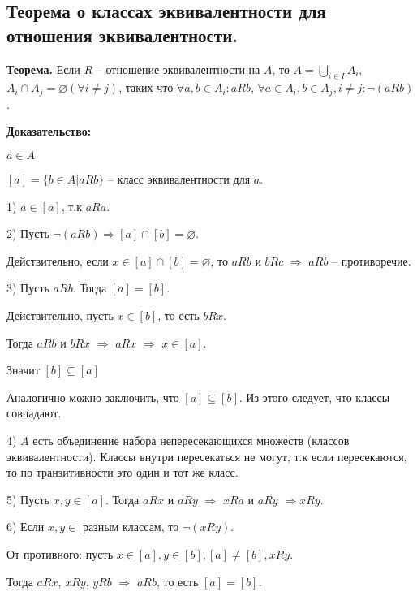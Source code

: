 \subsection{Теорема о классах эквивалентности для отношения эквивалентности.}

\textbf{Теорема.} Если $R$ -- отношение эквивалентности на $A$, то $A = \bigcup_{i \in I}A_i$, $A_i \cap A_j = \varnothing (\forall i \neq j)$, таких что $\forall a, b \in A_i : aRb$, $\forall a \in A_i, b \in A_j, i \neq j : \neg (aRb)$.

\textbf{Доказательство:}

$a \in A$

$[a] = \{b \in A | aRb\}$ -- класс эквивалентности для $a$.

1) $a \in [a]$, т.к $aRa$.

2) Пусть $\neg (aRb) \Rightarrow [a] \cap [b] = \varnothing$.

Действительно, если $x \in [a] \cap [b] = \varnothing$, то $aRb$ и  $bRc$
$\Rightarrow$ $aRb$ -- противоречие.

3) Пусть $aRb$. Тогда $[a] = [b]$.

Действительно, пусть $x \in [b]$, то есть $bRx$.

Тогда $aRb$ и $bRx$ $\Rightarrow$ $aRx$ $\Rightarrow$ $x \in [a]$.

Значит $[b] \subseteq [a]$

Аналогично можно заключить, что $[a] \subseteq [b]$. Из этого следует, что классы совпадают.

4) $A$ есть объединение набора непересекающихся множеств (классов эквивалентности). Классы внутри пересекаться не могут, т.к если пересекаются, то по транзитивности это один и тот же класс.

5) Пусть $x, y \in [a]$. Тогда $aRx$ и $aRy$ $\Rightarrow$ $xRa$ и $aRy$ $\Rightarrow xRy$.

6) Если $x, y \in$ разным классам, то $\neg(xRy)$.

От противного: пусть $x \in [a], y \in [b], [a] \neq [b], xRy$.

Тогда $aRx$, $xRy$, $yRb$ $\Rightarrow$ $aRb$, то есть $[a] = [b]$.